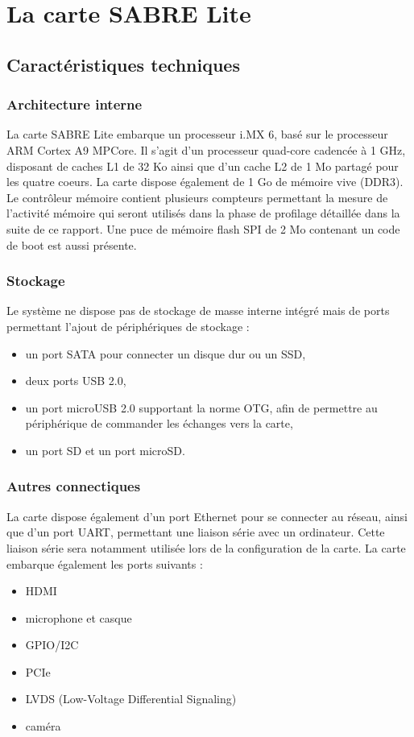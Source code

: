 \section{La carte SABRE Lite}

\subsection{Caractéristiques techniques}

\subsubsection{Architecture interne}
La carte SABRE Lite\cite{_i.mx_2014} embarque un processeur i.MX 6, basé sur le
processeur ARM Cortex A9 MPCore. Il s'agit d'un processeur quad-core cadencée à
1 GHz, disposant de caches L1 de 32 Ko ainsi que d'un cache L2 de 1 Mo partagé
pour les quatre coeurs. La carte dispose également de 1 Go de mémoire vive
(DDR3). Le contrôleur mémoire contient plusieurs compteurs permettant la mesure
de l'activité mémoire qui seront utilisés dans la phase de profilage détaillée
dans la suite de ce rapport. Une puce de mémoire flash SPI de 2 Mo contenant un
code de boot est aussi présente.

\subsubsection{Stockage}
Le système ne dispose pas de stockage de masse interne intégré mais de ports
permettant l'ajout de périphériques de stockage :
\begin{itemize}
\renewcommand{\labelitemi}{$\bullet$}
\item un port SATA pour connecter un disque dur ou un SSD,
\item deux ports USB 2.0,
\item un port microUSB 2.0 supportant la norme OTG, afin de permettre au 
  périphérique de commander les échanges vers la carte,
\item un port SD et un port microSD.
\end{itemize}

\subsubsection{Autres connectiques}
La carte dispose également d'un port Ethernet pour se connecter au réseau, ainsi
que d'un port UART, permettant une liaison série avec un ordinateur. Cette
liaison série sera notamment utilisée lors de la configuration de la carte. La
carte embarque également les ports suivants :
\begin{itemize}
\renewcommand{\labelitemi}{$\bullet$}
\item HDMI
\item microphone et casque
\item GPIO/I2C
\item PCIe
\item LVDS (Low-Voltage Differential Signaling)
\item caméra
\end{itemize}


